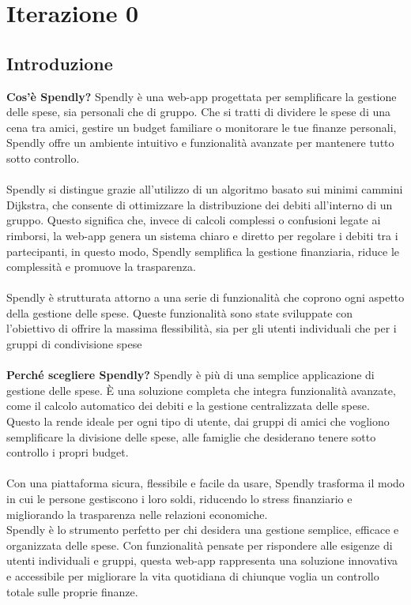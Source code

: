 \chapter{Iterazione 0}
\section{Introduzione}
\textbf{Cos'è Spendly?}
Spendly è una web-app progettata per semplificare la gestione delle spese, sia personali che di gruppo. Che si tratti di dividere le spese di una cena tra amici, gestire un budget familiare o monitorare le tue finanze personali, Spendly offre un ambiente intuitivo e funzionalità avanzate per mantenere tutto sotto controllo.
\\
\\Spendly si distingue grazie all'utilizzo di un algoritmo basato sui minimi cammini Dijkstra, che consente di ottimizzare la distribuzione dei debiti all'interno di un gruppo. Questo significa che, invece di calcoli complessi o confusioni legate ai rimborsi, la web-app genera un sistema chiaro e diretto per regolare i debiti tra i partecipanti, in questo modo, Spendly semplifica la gestione finanziaria, riduce le complessità e promuove la trasparenza.
\\
\\
Spendly è strutturata attorno a una serie di funzionalità che coprono ogni aspetto della gestione delle spese. Queste funzionalità sono state sviluppate con l'obiettivo di offrire la massima flessibilità, sia per gli utenti individuali che per i gruppi di condivisione spese
\\
\\
\textbf{Perché scegliere Spendly?}
Spendly è più di una semplice applicazione di gestione delle spese. È una soluzione completa che integra funzionalità avanzate, come il calcolo automatico dei debiti e la gestione centralizzata delle spese. Questo la rende ideale per ogni tipo di utente, dai gruppi di amici che vogliono semplificare la divisione delle spese, alle famiglie che desiderano tenere sotto controllo i propri budget.
\\
\\Con una piattaforma sicura, flessibile e facile da usare, Spendly trasforma il modo in cui le persone gestiscono i loro soldi, riducendo lo stress finanziario e migliorando la trasparenza nelle relazioni economiche.
\\
Spendly è lo strumento perfetto per chi desidera una gestione semplice, efficace e organizzata delle spese. Con funzionalità pensate per rispondere alle esigenze di utenti individuali e gruppi, questa web-app rappresenta una soluzione innovativa e accessibile per migliorare la vita quotidiana di chiunque voglia un controllo totale sulle proprie finanze.

